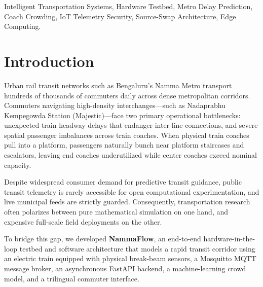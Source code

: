 \documentclass[conference]{IEEEtran}
\begin{document}
\begin{IEEEkeywords}
Intelligent Transportation Systems, Hardware Testbed, Metro Delay Prediction, Coach Crowding, IoT Telemetry Security, Source-Swap Architecture, Edge Computing.
\end{IEEEkeywords}

\section{Introduction}
Urban rail transit networks such as Bengaluru's Namma Metro transport hundreds of thousands of commuters daily across dense metropolitan corridors. Commuters navigating high-density interchanges---such as Nadaprabhu Kempegowda Station (Majestic)---face two primary operational bottlenecks: unexpected train headway delays that endanger inter-line connections, and severe spatial passenger imbalances across train coaches. When physical train coaches pull into a platform, passengers naturally bunch near platform staircases and escalators, leaving end coaches underutilized while center coaches exceed nominal capacity.

Despite widespread consumer demand for predictive transit guidance, public transit telemetry is rarely accessible for open computational experimentation, and live municipal feeds are strictly guarded. Consequently, transportation research often polarizes between pure mathematical simulation on one hand, and expensive full-scale field deployments on the other.

To bridge this gap, we developed \textbf{NammaFlow}, an end-to-end hardware-in-the-loop testbed and software architecture that models a rapid transit corridor using an electric train equipped with physical break-beam sensors, a Mosquitto MQTT message broker, an asynchronous FastAPI backend, a machine-learning crowd model, and a trilingual commuter interface.
\end{document}
